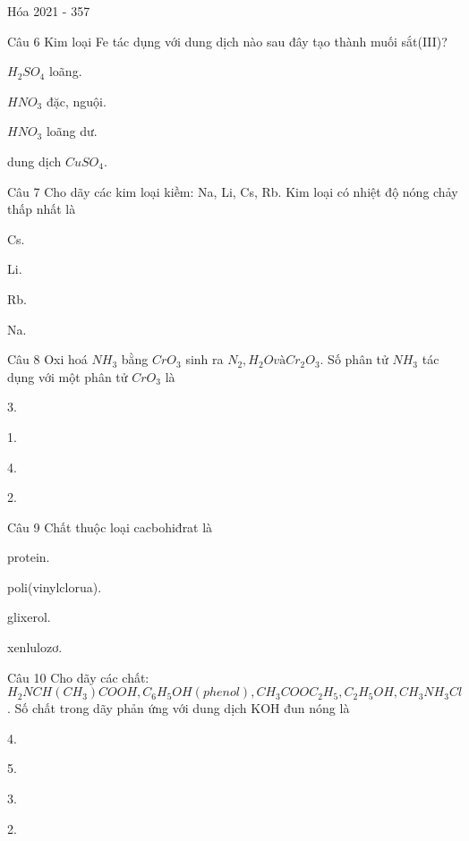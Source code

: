 \documentclass{book}
\begin{document}
\begin{quiz}{Hóa 2021 - 357}
\begin{multi}[points=1]{Câu 6}
 Kim loại Fe tác dụng với dung dịch nào sau đây tạo thành muối sắt(III)? 

\item  $H_2SO_4$ loãng.	
\item  $HNO_3$ đặc, nguội.	
\item*  $HNO_3$ loãng dư.	
\item  dung dịch $CuSO_4$.
\end{multi}

\begin{multi}[points=1]{Câu 7}
 Cho dãy các kim loại kiềm: Na, Li, Cs, Rb. Kim loại có nhiệt độ nóng chảy thấp nhất là

\item*  Cs.	
\item  Li.	
\item  Rb.	
\item  Na.
\end{multi}

\begin{multi}[points=1]{Câu 8}
 Oxi hoá $NH_3$ bằng $CrO_3$ sinh ra $N_2, H_2O và Cr_2O_3$. Số phân tử $NH_3$ tác dụng với một phân tử $CrO_3$ là

\item  3.	
\item*  1.	
\item  4.	
\item  2.
\end{multi}

\begin{multi}[points=1]{Câu 9}
 Chất thuộc loại cacbohiđrat là 

\item  protein.	
\item  poli(vinylclorua).	
\item  glixerol.	
\item*  xenlulozơ.
\end{multi}

\begin{multi}[points=1]{Câu 10}
 Cho dãy các chất: $H_2NCH(CH_3)COOH, C_6H_5OH (phenol), CH_3COOC_2H_5, C_2H_5OH, CH_3NH_3Cl$. Số chất trong dãy phản ứng với dung dịch KOH đun nóng là

\item*  4.	
\item  5.	
\item  3.	
\item  2.
\end{multi}


\end{quiz}
\end{document}
